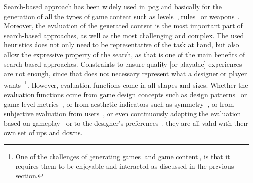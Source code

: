 Search-based approach has been widely used in~\acrshort{pcg} and basically for the generation of all the types of game content such as levels~\cite{dormans2011generating}, rules~\cite{font2013-GenCardGames} or weapons~\cite{Gravina2016-WeaponGenSurpriseSearch}. Moreover, the evaluation of the generated content is the most important part of search-based approaches, as well as the most challenging and complex. The used heuristics does not only need to be representative of the task at hand, but also allow the expressive property of the search, as that is one of the main benefits of search-based approaches. Constraints to ensure quality [or playable] experiences are not enough, since that does not necessary represent what a designer or player wants~\footnote{One of the challenges of generating games [and game content], is that it requires them to be enjoyable and interacted as discussed in the previous section.}. However, evaluation functions come in all shapes and sizes. Whether the evaluation functions come from game design concepts such as design patterns~\cite{dahlskog2014-PCGDesignPatterns} or game level metrics~\cite{canossa2015-towardspcgEvaluation}, or from aesthetic indicators such as symmetry~\cite{Marinho2015-empiricalEvaluation}, or from subjective evaluation from users~\cite{Schrum2020-IE_GAN}, or even continuously adapting the evaluation based on gameplay~\cite{hastings_evolving_2009} or to the designer's preferences~\cite{Liapis2012-adaptiveVisual}, they are all valid with their own set of ups and downs.











